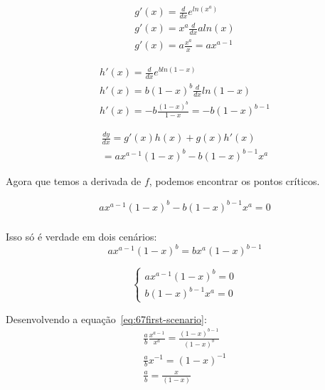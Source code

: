  \begin{equation}
    \begin{split}
        g'(x) = \frac{d}{dx}e^{ln(x^a)} \\
        g'(x) = x^a\frac{d}{dx}aln(x) \\
        g'(x) = a\frac{x^a}{x} = ax^{a-1}
    \end{split}
 \end{equation}

  \begin{equation}
    \begin{split}
        h'(x) = \frac{d}{dx}e^{bln(1-x)} \\
        h'(x) = b(1-x)^b\frac{d}{dx}ln(1-x) \\
        h'(x) = -b\frac{(1-x)^b}{1-x} = -b(1-x)^{b-1}
    \end{split}
 \end{equation}

 \begin{equation}
    \begin{split}
        \frac{dy}{dx} = g'(x)h(x) + g(x)h'(x) \\
        =ax^{a-1}(1-x)^b-b(1-x)^{b-1}x^a
    \end{split}
 \end{equation}

 Agora que temos a derivada de $f$, podemos encontrar os pontos críticos.

 \begin{equation}
    \begin{split}
        ax^{a-1}(1-x)^b-b(1-x)^{b-1}x^a = 0 \\
    \end{split}
 \end{equation}

 Isso só é verdade em dois cenários: 
 \begin{equation}
    ax^{a-1}(1-x)^b = bx^a(1-x)^{b-1}
    \label{eq:67first-scenario}
 \end{equation}

 \begin{equation}
    \left\{
        \begin{aligned}
            ax^{a-1}(1-x)^b = 0 \\
            b(1-x)^{b-1}x^a = 0
        \end{aligned}
    \right.
    \label{eq:67second-scenario}
 \end{equation}

 Desenvolvendo a equação~\ref{eq:67first-scenario}:
 \begin{equation}
    \begin{split}
        \frac{a}{b}\frac{x^{a-1}}{x^a} = \frac{(1-x)^{b-1}}{(1-x)^b} \\
        \frac{a}{b}x^{-1} = (1-x)^{-1} \\
        \frac{a}{b} = \frac{x}{(1-x)}
    \end{split}
 \end{equation}

